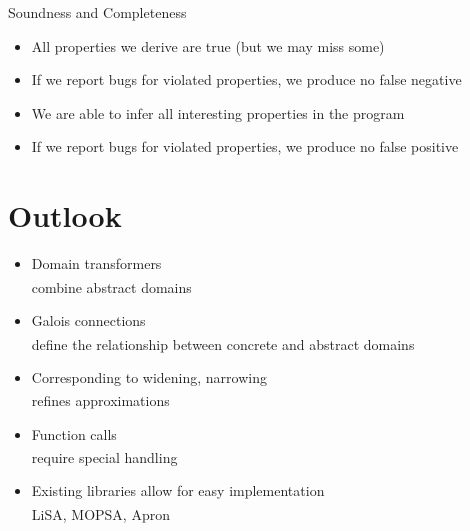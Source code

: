 \documentclass[
   aspectratio=169, %
   10pt, %
   uniqueslidenumber,
   sectiontitleslides,
   professionalfonts
]{beamer}
\begin{document}
\begin{frame}{Soundness and Completeness}
   \vspace*{-2mm}
   \begin{itemize}
      \item<3-> All properties we derive are true (but we may miss some)
      \item<4-> If we report bugs for violated properties, we produce no false negative
   \end{itemize}
   \bigskip

   \vspace*{-2mm}
   \begin{itemize}
      \item<6-> We are able to infer all interesting properties in the program
      \item<7-> If we report bugs for violated properties, we produce no false positive
   \end{itemize}
   \begin{center}
   \end{center}
\end{frame}


\section{Outlook}
\begin{frame}{\insertsection}
   \begin{itemize}[<+(1)->]
      \itemsep8pt
      \item Domain transformers\\
         \color{gray}combine abstract domains\textsuperscript{\cite[149]{DBLP:journals/ftpl/Mine17}}
      \item Galois connections\\
         \color{gray}define the relationship between concrete and abstract domains\textsuperscript{\cite[110]{cousout2021principles}}
      \item Corresponding to widening, narrowing\\
      \color{gray}refines approximations\textsuperscript{\cite[395]{cousout2021principles}}
      \item Function calls\\
      \color{gray}require special handling\textsuperscript{\cite{DBLP:journals/iandc/MidtgaardJ12}}
      \item Existing libraries allow for easy implementation\\
      \color{gray}LiSA\textsuperscript{\cite{DBLP:conf/pldi/FerraraNAC21}}, MOPSA\textsuperscript{\cite{DBLP:conf/vstte/JournaultMMO19}}, Apron\textsuperscript{\cite{DBLP:conf/cav/JeannetM09}}
   \end{itemize}
\end{frame}
\end{document}
